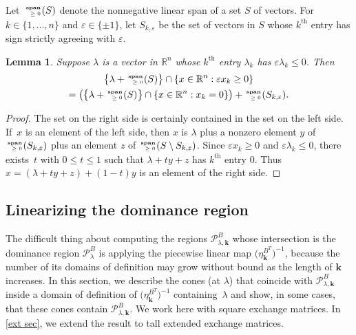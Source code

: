 \documentclass{amsart}
\newtheorem{lemma}[proposition]{Lemma}
\theoremstyle{definition}
\theoremstyle{remark}
\numberwithin{equation}{section}
\newcommand{\reals}{\mathbb R}
\newcommand{\ep}{\varepsilon}
\newcommand{\sgn}{\operatorname{sgn}}
\newcommand{\nnspan}{{\!\!\tiny\begin{array}{r}\mathbf{span}\\\ge0\end{array}\hspace*{-0.57em}}}
\newcommand{\set}[1]{{\lbrace #1 \rbrace}}
\newcommand{\sett}[1]{{\bigl\lbrace #1 \bigr\rbrace}}
\renewcommand{\th}{^\text{th}}
\newcommand{\0}{{\mathbf{0}}}
\newcommand{\g}{\mathbf{g}}
\newcommand{\kk}{{\boldsymbol{k}}}
\renewcommand{\P}{\mathcal{P}}
\renewcommand{\th}{^\text{th}}
\begin{document}
Let~$\nnspan(S)$ denote the nonnegative linear span of a set $S$ of vectors.
For ${k\in\set{1,\ldots,n}}$ and $\ep\in\set{\pm1}$, let $S_{k,\ep}$ be the set of vectors in $S$ whose $k\th$ entry has sign strictly agreeing with $\ep$.

\begin{lemma}\label{ps lemma}
Suppose $\lambda$ is a vector in $\reals^n$ whose $k\th$ entry $\lambda_k$ has $\ep\lambda_k\le0$.
Then %
\begin{multline*}
\sett{\lambda+\nnspan(S)}\cap\set{x\in\reals^n:\ep x_k\ge0}\\
=\bigl(\sett{\lambda+\nnspan(S)}\cap\set{x\in\reals^n:x_k=0}\bigr)+\nnspan(S_{k,\ep}).
\end{multline*}
\end{lemma}
\begin{proof}
The set on the right side is certainly contained in the set on the left side.
If~$x$ is an element of the left side, then $x$ is $\lambda$ plus a nonzero element $y$ of $\nnspan(S_{k,\ep})$ plus an element $z$ of $\nnspan(S\setminus S_{k,\ep})$.
Since $\ep x_k\ge0$ and $\ep\lambda_k\le0$, there exists~$t$ with ${0\le t\le1}$ such that $\lambda+ty+z$ has $k\th$ entry $0$.
Thus ${x=(\lambda+ty+z)+(1-t)y}$ is an element of the right side.
\end{proof}

\subsection{Linearizing the dominance region}\label{lin sec}
The difficult thing about computing the regions $\P^B_{\lambda,\kk}$ whose intersection is the dominance region $\P^B_\lambda$ is applying the piecewise linear map $\bigl(\eta^{B^T}_\kk\bigr)^{-1}$, because the number of its domains of definition may grow without bound as the length of $\kk$ increases.
In this section, we describe the cones (at $\lambda$) that coincide with $\P^B_{\lambda,\kk}$ inside a domain of definition of $\bigl(\eta^{B^T}_\kk\bigr)^{-1}$ containing~$\lambda$ and show, in some cases, that these cones contain $\P^B_{\lambda,\kk}$.
We work here with square exchange matrices.
In \cref{ext sec}, we extend the result to tall extended exchange matrices.
\end{document}
